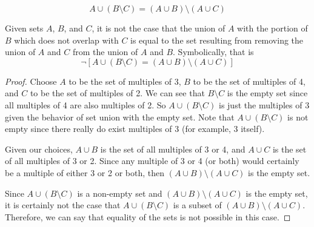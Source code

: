 \documentclass[main.tex]{subfiles}
\begin{document}
\subproblem{}\label{2h}
\[A \cup (B \setminus C) = (A \cup B) \setminus (A \cup C)\]
\begin{thm}
	Given sets \(A\), \(B\), and \(C\), it is not the case that the union of
	\(A\) with the portion of \(B\) which does not overlap with \(C\) is
	equal to the set resulting from removing the union of \(A\) and \(C\)
	from the union of \(A\) and \(B\). Symbolically, that is
	\[\neg [A \cup (B \setminus C) = (A \cup B) \setminus (A \cup C)]\]
\end{thm}
\begin{proof}
	Choose \(A\) to be the set of multiples of 3, \(B\) to be the set of
	multiples of 4, and \(C\) to be the set of multiples of 2. We can see
	that \(B \setminus C\) is the empty set since all multiples of 4 are
	also multiples of 2. So \(A \cup (B \setminus C)\) is just the multiples
	of 3 given the behavior of set union with the empty set. Note that
	\(A \cup (B \setminus C)\) is not empty since there really do exist
	multiples of 3 (for example, 3 itself).

	Given our choices, \(A \cup B\) is the set of all multiples of 3 or 4,
	and \(A \cup C\) is the set of all multiples of 3 or 2. Since any
	multiple of 3 or 4 (or both) would certainly be a multiple of either 3
	or 2 or both, then \((A \cup B) \setminus (A \cup C)\) is the empty set.

	Since \(A \cup (B \setminus C)\) is a non-empty set and
	\((A \cup B) \setminus (A \cup C)\) is the empty set, it is certainly
	not the case that \(A \cup (B \setminus C)\) is a subset of
	\((A \cup B) \setminus (A \cup C)\). Therefore, we can say that equality
	of the sets is not possible in this case.
\end{proof}
\end{document}
